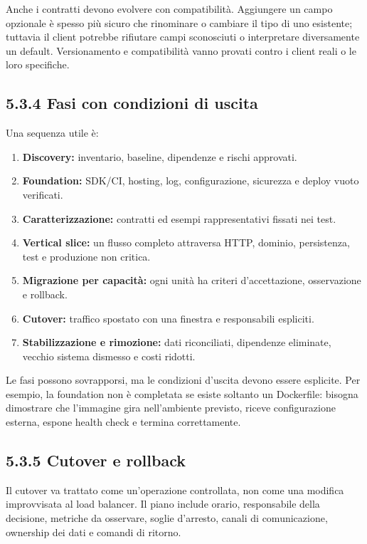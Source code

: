 \documentclass[
  italian,
  10pt,
]{book}
\providecommand{\tightlist}{%
  \setlength{\itemsep}{0pt}\setlength{\parskip}{0pt}}
\begin{document}
Anche i contratti devono evolvere con compatibilità. Aggiungere un campo
opzionale è spesso più sicuro che rinominare o cambiare il tipo di uno
esistente; tuttavia il client potrebbe rifiutare campi sconosciuti o
interpretare diversamente un default. Versionamento e compatibilità
vanno provati contro i client reali o le loro specifiche.

\subsection{5.3.4 Fasi con condizioni di
uscita}\label{fasi-con-condizioni-di-uscita}

Una sequenza utile è:

\begin{enumerate}
\def\labelenumi{\arabic{enumi}.}
\tightlist
\item
  \textbf{Discovery:} inventario, baseline, dipendenze e rischi
  approvati.
\item
  \textbf{Foundation:} SDK/CI, hosting, log, configurazione, sicurezza e
  deploy vuoto verificati.
\item
  \textbf{Caratterizzazione:} contratti ed esempi rappresentativi
  fissati nei test.
\item
  \textbf{Vertical slice:} un flusso completo attraversa HTTP, dominio,
  persistenza, test e produzione non critica.
\item
  \textbf{Migrazione per capacità:} ogni unità ha criteri
  d'accettazione, osservazione e rollback.
\item
  \textbf{Cutover:} traffico spostato con una finestra e responsabili
  espliciti.
\item
  \textbf{Stabilizzazione e rimozione:} dati riconciliati, dipendenze
  eliminate, vecchio sistema dismesso e costi ridotti.
\end{enumerate}

Le fasi possono sovrapporsi, ma le condizioni d'uscita devono essere
esplicite. Per esempio, la foundation non è completata se esiste
soltanto un Dockerfile: bisogna dimostrare che l'immagine gira
nell'ambiente previsto, riceve configurazione esterna, espone health
check e termina correttamente.

\subsection{5.3.5 Cutover e rollback}\label{cutover-e-rollback}

Il cutover va trattato come un'operazione controllata, non come una
modifica improvvisata al load balancer. Il piano include orario,
responsabile della decisione, metriche da osservare, soglie d'arresto,
canali di comunicazione, ownership dei dati e comandi di ritorno.
\end{document}

